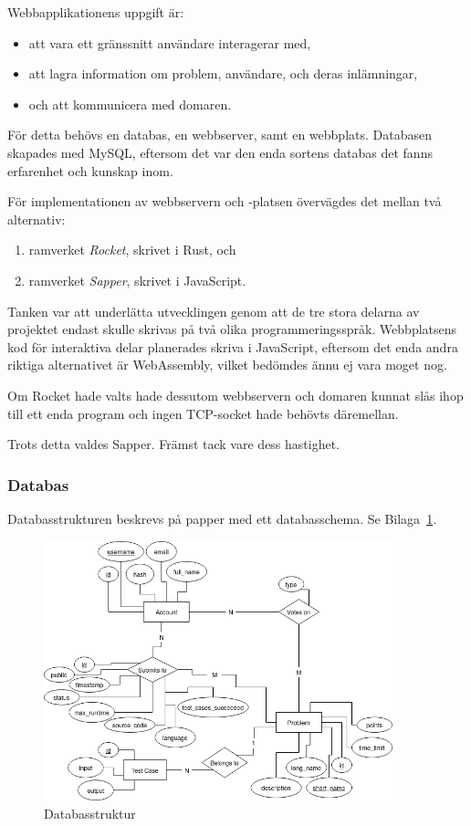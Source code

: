 \documentclass{article}
\renewcommand*\figurename{Bilaga}
\begin{document}
Webbapplikationens uppgift är:

\begin{itemize}
	\item att vara ett gränssnitt användare interagerar med,
	\item att lagra information om problem, användare, och deras inlämningar,
	\item och att kommunicera med domaren.
\end{itemize}

För detta behövs en databas, en webbserver, samt en webbplats. Databasen
skapades med MySQL, eftersom det var den enda sortens databas det fanns
erfarenhet och kunskap inom.

För implementationen av webbservern och -platsen övervägdes det mellan två
alternativ:

\begin{enumerate}
	\item ramverket \textit{Rocket}, skrivet i Rust, och
	\item ramverket \textit{Sapper}, skrivet i JavaScript.
\end{enumerate}

Tanken var att underlätta utvecklingen genom att de tre stora delarna av
projektet endast skulle skrivas på två olika programmeringsspråk. Webbplatsens
kod för interaktiva delar planerades skriva i JavaScript, eftersom det enda
andra riktiga alternativet är WebAssembly, vilket bedömdes ännu ej vara moget
nog.

Om Rocket hade valts hade dessutom webbservern och domaren kunnat slås ihop till
ett enda program och ingen TCP-socket hade behövts däremellan.

Trots detta valdes Sapper. Främst tack vare dess hastighet.

\subsubsection{Databas}

Databasstrukturen beskrevs på papper med ett databasschema. Se
\figurename{}~\ref{dbschema}.

\begin{figure}[H]
	\centering
	\includegraphics[width=0.9\textwidth]{database-schema}
	\caption{Databasstruktur}\label{dbschema}
\end{figure}
\end{document}
